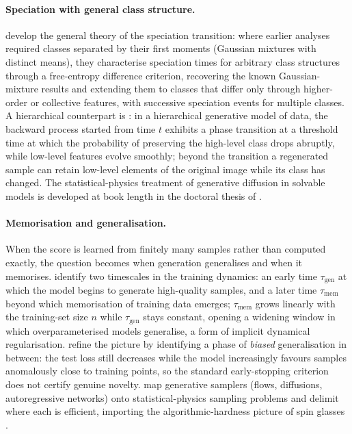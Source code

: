 \paragraph{Speciation with general class structure.}
\citet{achilli2026speciation} develop the general theory of the
speciation transition: where earlier analyses required classes separated
by their first moments (Gaussian mixtures with distinct means), they
characterise speciation times for arbitrary class structures through a
free-entropy difference criterion, recovering the known Gaussian-mixture
results and extending them to classes that differ only through
higher-order or collective features, with successive speciation events
for multiple classes. A hierarchical counterpart is
\citet{sclocchi2025phase}: in a hierarchical generative model of data,
the backward process started from time $t$ exhibits a phase transition at
a threshold time at which the probability of preserving the high-level
class drops abruptly, while low-level features evolve smoothly; beyond
the transition a regenerated sample can retain low-level elements of the
original image while its class has changed. The statistical-physics
treatment of generative diffusion in solvable models is developed at
book length in the doctoral thesis of \citet{achilli2026thesis}.

\paragraph{Memorisation and generalisation.} When the score is learned
from finitely many samples rather than computed exactly, the question
becomes when generation generalises and when it memorises.
\citet{bonnaire2025memorize} identify two timescales in the training
dynamics: an early time $\tau_{\mathrm{gen}}$ at which the model begins
to generate high-quality samples, and a later time $\tau_{\mathrm{mem}}$
beyond which memorisation of training data emerges;
$\tau_{\mathrm{mem}}$ grows linearly with the training-set size $n$ while
$\tau_{\mathrm{gen}}$ stays constant, opening a widening window in which
overparameterised models generalise, a form of implicit dynamical
regularisation. \citet{garnierbrun2026biased} refine the picture by
identifying a phase of \emph{biased} generalisation in between: the test
loss still decreases while the model increasingly favours samples
anomalously close to training points, so the standard early-stopping
criterion does not certify genuine novelty. \citet{ghio2024sampling} map
generative samplers (flows, diffusions, autoregressive networks) onto
statistical-physics sampling problems and delimit where each is
efficient, importing the algorithmic-hardness picture of spin glasses
\citep{zdeborova2016statistical}.

